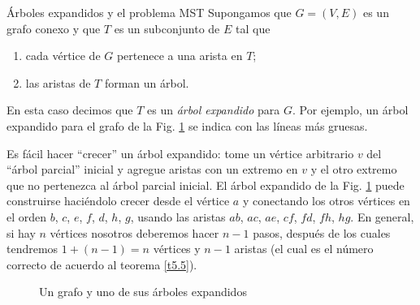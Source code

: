 \begin{section}{Árboles expandidos y el problema MST} \label{6.2}
Supongamos que $G=(V,E)$ es un grafo conexo y que $T$ es un subconjunto de $E$ tal que
\begin{enumerate}[label=(\alph*)]
\item  cada vértice de $G$ pertenece a una arista en $T$;
\item  las aristas de $T$ forman un árbol.
\end{enumerate}
En esta caso decimos que $T$ es un \textit{árbol expandido} para  $G$. Por ejemplo, un árbol expandido para el grafo de la Fig. \ref{f6.3} se indica con las líneas más gruesas.

Es fácil hacer ``crecer'' un árbol expandido: tome un vértice arbitrario $v$ del ``árbol parcial'' inicial y agregue aristas con un extremo en $v$ y el otro extremo que no pertenezca al árbol parcial inicial. El árbol expandido de la Fig. \ref{f6.3} puede construirse haciéndolo crecer desde el vértice $a$ y conectando los otros vértices en el orden $b$, $c$, $e$, $f$, $d$, $h$, $g$, usando las aristas $ab$, $ac$, $ae$, $cf$,  $fd$, $fh$, $hg$. En general, si hay $n$ vértices nosotros deberemos hacer $n-1$ pasos, después de los cuales tendremos $1+(n-1)=n$ vértices y $n-1$ aristas (el cual es el número correcto de acuerdo al teorema \ref{t5.5}).

\begin{figure}[ht]
    \begin{center}
    \end{center}
    \caption{Un grafo y uno de sus árboles expandidos} \label{f6.3}
\end{figure}



\end{section}

